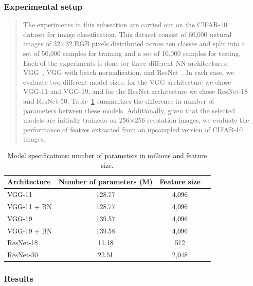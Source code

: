 \subsubsection*{Experimental setup} 
\begin{quote}
The experiments in this subsection are carried out on the CIFAR-10 dataset for image classification. This dataset consist of 60,000 natural images of 32$\times$32 RGB pixels distributed across ten classes and split into a set of 50,000 samples for training and a set of 10,000 samples for testing. Each of the experiments is done for three different NN architectures: VGG~\cite{2016_ICLR_VGG}, VGG with batch normalization, and ResNet~\cite{2016_CVPR_ResNet}. In each case, we evaluate two different model sizes: for the VGG architecture we chose VGG-11 and VGG-19, and for the ResNet architecture we chose ResNet-18 and ResNet-50. Table~\ref{tab:NN_specs} summarizes the difference in number of parameters between these models. Additionally, given that the selected models are initially trainedo on 256$\times$256 resolution images, we evaluate the performance of featres extracted from an upsampled version of CIFAR-10 images.  
\end{quote}

\begin{table}[h]
    \centering      
    \caption{\label{tab:NN_specs} Model specifications: number of parameters in millions and feature size.} 
    \begin{tabular}{lccc}
        \hline 
        {Architecture} & {Number of parameters (M)} & {Feature size} \tabularnewline
         \hline
        VGG-11 & 128.77 &  4,096 \tabularnewline
        VGG-11 + BN & 128.77 &  4,096 \tabularnewline
        VGG-19 & 139.57 &  4,096  \tabularnewline
        VGG-19 + BN & 139.58 &  4,096  \tabularnewline
        ResNet-18 & 11.18 & 512 \tabularnewline
        ResNet-50 & 22.51 &  2,048 \tabularnewline
        \hline
    \end{tabular} 
\end{table}

\subsubsection{Results}\label{subsubsec:NNfeatExtr_Res}

